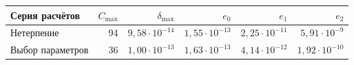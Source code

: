 \begin{tabular}{lrrrrr}
\hline
Серия расчётов & $C_{\max}$ & $\delta_{\max}$ & $e_0$ & $e_1$ & $e_2$ \\
\hline
Нетерпение & 94 & $9{,}58\cdot10^{-14}$ & $1{,}55\cdot10^{-13}$ & $2{,}25\cdot10^{-11}$ & $5{,}91\cdot10^{-9}$ \\
Выбор параметров & 36 & $1{,}00\cdot10^{-13}$ & $1{,}63\cdot10^{-13}$ & $4{,}14\cdot10^{-12}$ & $1{,}92\cdot10^{-10}$ \\
\hline
\end{tabular}
